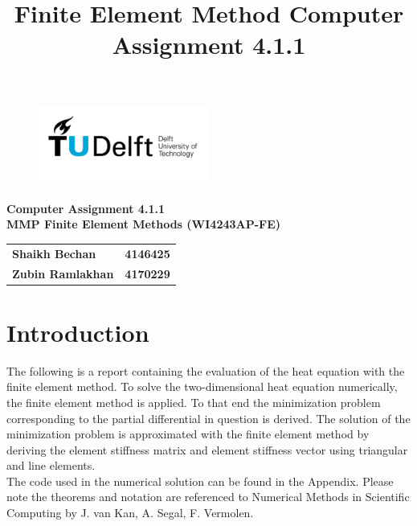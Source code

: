 \documentclass[10pt,a4paper]{article}
\title{Finite Element Method Computer Assignment 4.1.1}
\begin{document}
\begin{figure}[t]
	\centering
	\includegraphics[width=0.5\textwidth]{TU_d_line_P1_color_1.jpg}
\end{figure}

\begin{center}
	\textbf{Computer Assignment 4.1.1}\\
	\textbf{MMP Finite Element Methods (WI4243AP-FE)}
	\begin{tabular}{lr}
		\textbf{Shaikh Bechan} & \textbf{4146425}\\
		\textbf{Zubin Ramlakhan} & \textbf{4170229}\\
	\end{tabular}
\end{center}

\section{Introduction}
The following is a report containing the evaluation of the heat equation with the finite element method.
To solve the two-dimensional heat equation numerically, the finite element method is applied. To that end the minimization problem corresponding to the partial differential in question is derived. The solution of the minimization problem is approximated with the finite element method by deriving the element stiffness matrix and element stiffness vector using triangular and line elements.\\
The code used in the numerical solution can be found in the Appendix.
Please note the theorems and notation are referenced to Numerical Methods in Scientific Computing by J. van Kan, A. Segal, F. Vermolen.
\end{document}
